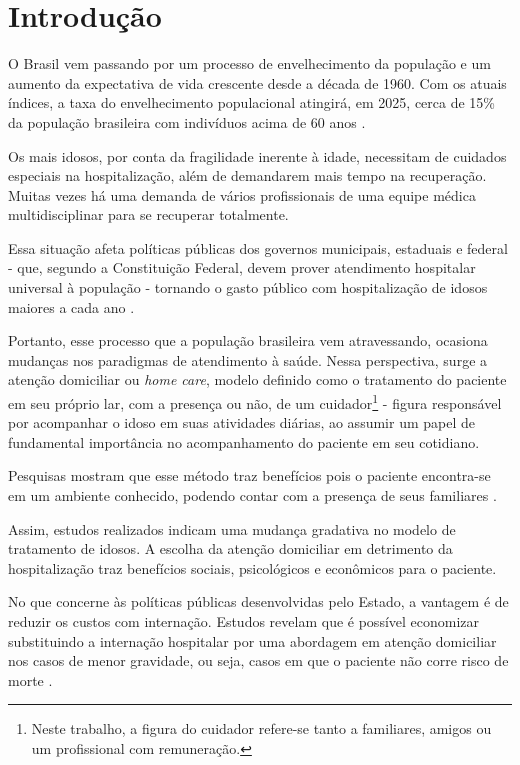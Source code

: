 \chapter{Introdução}\label{cap:introducao}

O Brasil vem passando por um processo de envelhecimento da população e
um aumento da expectativa de vida crescente desde a década de 1960. 
Com os atuais índices, a taxa do envelhecimento populacional atingirá, 
em 2025, cerca de 15\% da população brasileira com indivíduos acima 
de 60 anos \cite{gonccalves2006perfil}. 

Os mais idosos, por conta da fragilidade inerente à idade, necessitam de 
cuidados especiais na hospitalização, além de demandarem mais tempo na 
recuperação. Muitas vezes há uma demanda de vários profissionais de uma equipe 
médica multidisciplinar para se recuperar totalmente.

Essa situação afeta políticas públicas dos governos municipais, estaduais e
federal - que, segundo a Constituição Federal, devem prover atendimento
hospitalar universal à população - tornando o gasto público com hospitalização
de idosos maiores a cada ano \cite{da2013gastos}.

Portanto, esse processo que a população brasileira vem atravessando, ocasiona
mudanças  nos paradigmas de atendimento à saúde. Nessa perspectiva, surge a
atenção domiciliar ou \textit{home care}, modelo definido como o tratamento do
paciente em seu próprio lar, com a presença ou não, de um
cuidador\footnote{Neste trabalho, a figura do cuidador refere-se tanto a
familiares, amigos ou um profissional com remuneração.} - figura responsável por
acompanhar o idoso em suas atividades diárias, ao assumir um papel de
fundamental importância no acompanhamento do paciente em seu cotidiano.

Pesquisas mostram que esse método traz benefícios pois o  paciente encontra-se
em um ambiente conhecido, podendo contar com a presença de seus familiares
\cite{hermann2007atendimento, day2010beneficios}.

Assim, estudos realizados indicam uma mudança gradativa no modelo de tratamento
de idosos. A escolha da atenção domiciliar em detrimento da hospitalização traz
benefícios sociais, psicológicos e econômicos para o paciente. 

No que concerne às políticas públicas desenvolvidas pelo Estado,  a vantagem é
de reduzir os custos com internação. Estudos revelam  que é possível economizar
substituindo a internação hospitalar por uma  abordagem em atenção domiciliar
nos casos de menor gravidade,  ou seja, casos em que o paciente não corre risco
de morte \cite{bourdette1993health}.  

